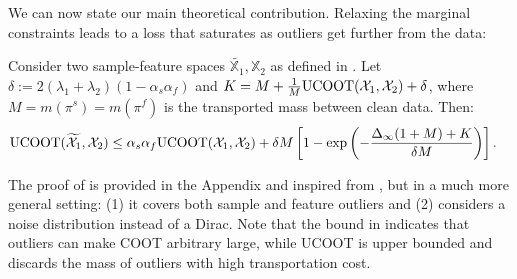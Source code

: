 We can now state our main theoretical contribution.
Relaxing the marginal constraints leads to a loss that saturates
as outliers get further from the data:
\begin{theorem}
\label{thm:ucoot_robust}
Consider two sample-feature spaces $\widetilde{\mathds X_1}, \mathds X_2$ as defined
in . Let $\delta := 2(\lambda_1 + \lambda_2)(1 - \alpha_s\alpha_f)$
and $K = M + \frac{1}{M}\text{UCOOT}(\mathcal X_1, \mathcal X_2) +\delta$,
where $M= m(\pi^s) = m(\pi^f)$ is the transported mass between clean data. Then:
\begin{align} %
  \ucoot(\widetilde{\cX_1}, \cX_2)
  &\leq \alpha_s \alpha_f \ucoot(\cX_1, \cX_2)
  + \delta M \left[ 1 - \exp \left( {- \frac{\Delta_{\infty}(1+M) + K}{\delta M}} \right) \right].
\end{align}
\end{theorem}
The proof of  is provided in the Appendix and
inspired from \citep{Fatras21}, but in a much more general setting:
(1) it covers both sample and feature outliers and
(2) considers a noise distribution instead of a Dirac.
Note that the bound in 
indicates that outliers can make COOT arbitrary large,
while UCOOT is upper bounded and discards the mass of outliers with high transportation cost.

